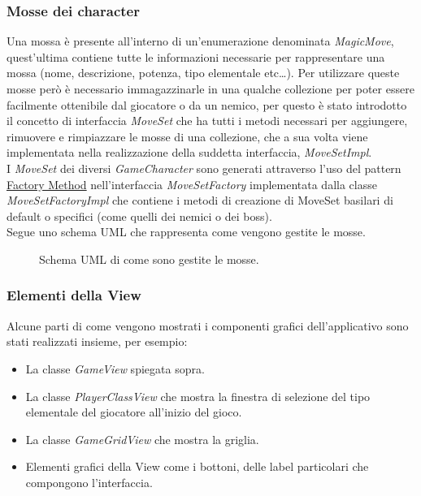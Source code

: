 \documentclass[a4paper,12pt]{report}
\begin{document}
\subsubsection{Mosse dei character}
Una mossa è presente all'interno di un'enumerazione denominata \textit{MagicMove}, quest'ultima contiene tutte le informazioni necessarie per rappresentare una mossa (nome, descrizione, potenza, tipo elementale etc\dots). Per utilizzare queste mosse però è necessario immagazzinarle in una qualche collezione per poter essere facilmente ottenibile dal giocatore o da un nemico, per questo è stato introdotto il concetto di interfaccia \textit{MoveSet} che ha tutti i metodi necessari per aggiungere, rimuovere e rimpiazzare le mosse di una collezione, che a sua volta viene implementata nella realizzazione della suddetta interfaccia, \textit{MoveSetImpl}.\\
I \textit{MoveSet} dei diversi \textit{GameCharacter} sono generati attraverso l'uso del pattern \href{https://refactoring.guru/design-patterns/factory-method}{Factory Method} nell'interfaccia \textit{MoveSetFactory} implementata dalla classe \textit{MoveSetFactoryImpl} che contiene i metodi di creazione di MoveSet basilari di default o specifici (come quelli dei nemici o dei boss).\\

Segue uno schema UML che rappresenta come vengono gestite le mosse.

\begin{figure}[H]
	\centering
	
	\caption{Schema UML di come sono gestite le mosse.}
	\label{fig:Schema UML di come sono gestite le mosse.}
\end{figure}

\subsubsection{Elementi della View}
Alcune parti di come vengono mostrati i componenti grafici dell'applicativo sono stati realizzati insieme, per esempio:
\begin{itemize}
	\item La classe \textit{GameView} spiegata sopra.
	\item La classe \textit{PlayerClassView} che mostra la finestra di selezione del tipo elementale del giocatore all'inizio del gioco.
	\item La classe \textit{GameGridView} che mostra la griglia.
	\item Elementi grafici della View come i bottoni, delle label particolari che compongono l'interfaccia.
\end{itemize}
\end{document}
